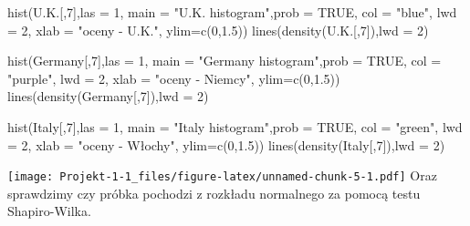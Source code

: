 \documentclass[
]{article}
\newenvironment{Shaded}{\begin{snugshade}}{\end{snugshade}}
\newcommand{\AttributeTok}[1]{\textcolor[rgb]{0.77,0.63,0.00}{#1}}
\newcommand{\ConstantTok}[1]{\textcolor[rgb]{0.00,0.00,0.00}{#1}}
\newcommand{\DecValTok}[1]{\textcolor[rgb]{0.00,0.00,0.81}{#1}}
\newcommand{\FloatTok}[1]{\textcolor[rgb]{0.00,0.00,0.81}{#1}}
\newcommand{\FunctionTok}[1]{\textcolor[rgb]{0.00,0.00,0.00}{#1}}
\newcommand{\NormalTok}[1]{#1}
\newcommand{\StringTok}[1]{\textcolor[rgb]{0.31,0.60,0.02}{#1}}
\begin{document}
\begin{Shaded}
\begin{Highlighting}[]
\FunctionTok{hist}\NormalTok{(U.K.[,}\DecValTok{7}\NormalTok{],}\AttributeTok{las =} \DecValTok{1}\NormalTok{, }\AttributeTok{main =} \StringTok{"U.K. histogram"}\NormalTok{,}\AttributeTok{prob =} \ConstantTok{TRUE}\NormalTok{,}
                      \AttributeTok{col =} \StringTok{"blue"}\NormalTok{,}
                      \AttributeTok{lwd =} \DecValTok{2}\NormalTok{,}
                      \AttributeTok{xlab =} \StringTok{"oceny {-} U.K."}\NormalTok{,}
                      \AttributeTok{ylim=}\FunctionTok{c}\NormalTok{(}\DecValTok{0}\NormalTok{,}\FloatTok{1.5}\NormalTok{))}
\FunctionTok{lines}\NormalTok{(}\FunctionTok{density}\NormalTok{(U.K.[,}\DecValTok{7}\NormalTok{]),}\AttributeTok{lwd =} \DecValTok{2}\NormalTok{)}

\FunctionTok{hist}\NormalTok{(Germany[,}\DecValTok{7}\NormalTok{],}\AttributeTok{las =} \DecValTok{1}\NormalTok{, }\AttributeTok{main =} \StringTok{"Germany histogram"}\NormalTok{,}\AttributeTok{prob =} \ConstantTok{TRUE}\NormalTok{,}
                      \AttributeTok{col =} \StringTok{"purple"}\NormalTok{,}
                      \AttributeTok{lwd =} \DecValTok{2}\NormalTok{,}
                      \AttributeTok{xlab =} \StringTok{"oceny {-} Niemcy"}\NormalTok{,}
                      \AttributeTok{ylim=}\FunctionTok{c}\NormalTok{(}\DecValTok{0}\NormalTok{,}\FloatTok{1.5}\NormalTok{))}
\FunctionTok{lines}\NormalTok{(}\FunctionTok{density}\NormalTok{(Germany[,}\DecValTok{7}\NormalTok{]),}\AttributeTok{lwd =} \DecValTok{2}\NormalTok{)}

\FunctionTok{hist}\NormalTok{(Italy[,}\DecValTok{7}\NormalTok{],}\AttributeTok{las =} \DecValTok{1}\NormalTok{, }\AttributeTok{main =} \StringTok{"Italy histogram"}\NormalTok{,}\AttributeTok{prob =} \ConstantTok{TRUE}\NormalTok{,}
                      \AttributeTok{col =} \StringTok{"green"}\NormalTok{,}
                      \AttributeTok{lwd =} \DecValTok{2}\NormalTok{,}
                      \AttributeTok{xlab =} \StringTok{"oceny {-} Włochy"}\NormalTok{,}
                      \AttributeTok{ylim=}\FunctionTok{c}\NormalTok{(}\DecValTok{0}\NormalTok{,}\FloatTok{1.5}\NormalTok{))}
\FunctionTok{lines}\NormalTok{(}\FunctionTok{density}\NormalTok{(Italy[,}\DecValTok{7}\NormalTok{]),}\AttributeTok{lwd =} \DecValTok{2}\NormalTok{)}
\end{Highlighting}
\end{Shaded}

\texttt{[image: Projekt-1-1\_files/figure-latex/unnamed-chunk-5-1.pdf]}
Oraz sprawdzimy czy próbka pochodzi z rozkładu normalnego za pomocą
testu Shapiro-Wilka.
\end{document}

